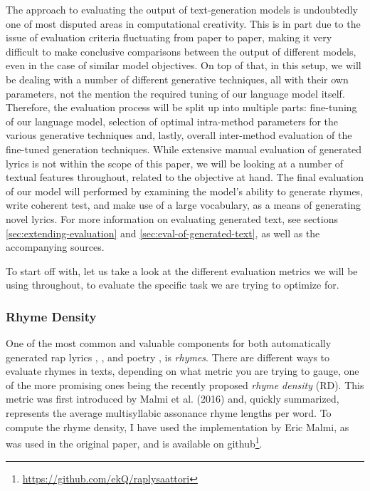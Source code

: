 The approach to evaluating the output of text-generation models is undoubtedly one of most disputed areas in computational creativity. This is in part due to the issue of evaluation criteria fluctuating from paper to paper, making it very difficult to make conclusive comparisons between the output of different models, even in the case of similar model objectives. On top of that, in this setup, we will be dealing with a number of different generative techniques, all with their own parameters, not the mention the required tuning of our language model itself. Therefore, the evaluation process will be split up into multiple parts: fine-tuning of our language model, selection of optimal intra-method parameters for the various generative techniques and, lastly, overall inter-method evaluation of the fine-tuned generation techniques. While extensive manual evaluation of generated lyrics is not within the scope of this paper, we will be looking at a number of textual features throughout, related to the objective at hand. The final evaluation of our model will performed by examining the model’s ability to generate rhymes, write coherent test, and make use of a large vocabulary, as a means of generating novel lyrics. For more information on evaluating generated text, see sections \cref{sec:extending-evaluation} and \cref{sec:eval-of-generated-text}, as well as the accompanying sources.

To start off with, let us take a look at the different evaluation metrics we will be using throughout, to evaluate the specific task we are trying to optimize for.

\subsubsection{Rhyme Density}
\label{sec:rhyme-density}

One of the most common and valuable components for both automatically generated rap lyrics \cite{potash-etal-2015-ghostwriter}, \cite{Malmi_2016}, \cite{PotashPeter2016ECLG} and poetry \cite{goncalo-oliveira-2017-survey}, \cite{GoncaloOliveiraHugo2014PGwP} is \textit{rhymes}. There are different ways to evaluate rhymes in texts, depending on what metric you are trying to gauge, one of the more promising ones being the recently proposed \textit{rhyme density} (RD). This metric was first introduced by Malmi et al. (2016) \cite{Malmi_2016} and, quickly summarized, represents the average multisyllabic assonance rhyme lengths per word.  To compute the rhyme density, I have used the implementation by Eric Malmi, as was used in the original paper, and is available on github\footnote{\url{https://github.com/ekQ/raplysaattori}}.

